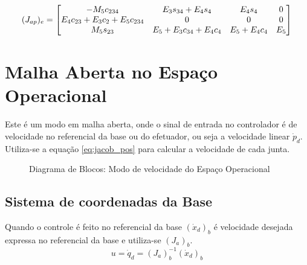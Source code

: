 \begin{equation}
({J}_{ap})_e =  
\begin{bmatrix}
    -M_5c_{234} & E_3s_{34}+E_4s_4 & E_4s_4 & 0 \\
    E_4c_{23}+E_3c_2+E_5c_{234} & 0 & 0 & 0 \\
    M_5s_{23} &  E_5+E_3c_{34}+E_4c_4 & E_5+E_4c_4 & E_5 
\end{bmatrix}
\end{equation}




\section{Malha Aberta no Espaço Operacional} 
Este é um modo em malha aberta, onde o sinal de entrada no controlador é de velocidade no referencial da base ou do efetuador, ou seja a velocidade linear ${\dot{p}}_d$. Utiliza-se a equação \eqref{eq:jacob_pos} para calcular a velocidade de cada junta. 

\begin{figure}[h!]
\centering
{}
\caption{Diagrama de Blocos: Modo de velocidade do Espaço Operacional}
\label{fig:vel_op}
\end{figure}


\subsection{Sistema de coordenadas da Base} \label{sec:openloopbase}
Quando o controle é feito no referencial da base $({\dot{x}}_d)_b$ é velocidade desejada expressa no referencial da base e utiliza-se $({J}_{a})_b$.
\begin{equation}
{u} = {\dot{q}}_d = ({J}_{a})_b^{-1} ({\dot{x}}_d)_b
\end{equation}
